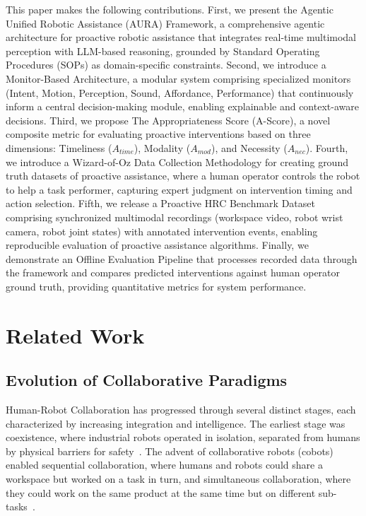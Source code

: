 \documentclass[11pt, a4paper]{article}
\begin{document}
This paper makes the following contributions. First, we present the Agentic Unified Robotic Assistance (AURA) Framework, a comprehensive agentic architecture for proactive robotic assistance that integrates real-time multimodal perception with LLM-based reasoning, grounded by Standard Operating Procedures (SOPs) as domain-specific constraints. Second, we introduce a Monitor-Based Architecture, a modular system comprising specialized monitors (Intent, Motion, Perception, Sound, Affordance, Performance) that continuously inform a central decision-making module, enabling explainable and context-aware decisions. Third, we propose The Appropriateness Score (A-Score), a novel composite metric for evaluating proactive interventions based on three dimensions: Timeliness ($A_{time}$), Modality ($A_{mod}$), and Necessity ($A_{nec}$). Fourth, we introduce a Wizard-of-Oz Data Collection Methodology for creating ground truth datasets of proactive assistance, where a human operator controls the robot to help a task performer, capturing expert judgment on intervention timing and action selection. Fifth, we release a Proactive HRC Benchmark Dataset comprising synchronized multimodal recordings (workspace video, robot wrist camera, robot joint states) with annotated intervention events, enabling reproducible evaluation of proactive assistance algorithms. Finally, we demonstrate an Offline Evaluation Pipeline that processes recorded data through the  framework and compares predicted interventions against human operator ground truth, providing quantitative metrics for system performance.

\section{Related Work}

\subsection{Evolution of Collaborative Paradigms}

Human-Robot Collaboration has progressed through several distinct stages, each characterized by increasing integration and intelligence. The earliest stage was coexistence, where industrial robots operated in isolation, separated from humans by physical barriers for safety~\cite{Asad2023}. The advent of collaborative robots (cobots) enabled sequential collaboration, where humans and robots could share a workspace but worked on a task in turn, and simultaneous collaboration, where they could work on the same product at the same time but on different sub-tasks~\cite{Zhou2024}.
\end{document}
